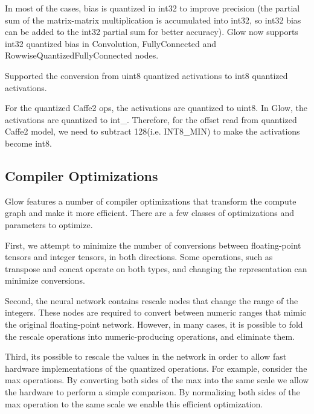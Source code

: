 In most of the cases, bias is quantized in int32 to improve precision (the partial sum of the matrix-\/matrix multiplication is accumulated into int32, so int32 bias can be added to the int32 partial sum for better accuracy). Glow now supports int32 quantized bias in {\ttfamily Convolution}, {\ttfamily Fully\+Connected} and {\ttfamily Rowwise\+Quantized\+Fully\+Connected} nodes.


\begin{DoxyItemize}
\item Supported the conversion from uint8 quantized activations to int8 quantized activations.
\end{DoxyItemize}

For the quantized Caffe2 ops, the activations are quantized to uint8. In Glow, the activations are quantized to int\+\_. Therefore, for the offset read from quantized Caffe2 model, we need to subtract 128(i.\+e. I\+N\+T8\+\_\+\+M\+IN) to make the activations become int8.

\subsection*{Compiler Optimizations}

Glow features a number of compiler optimizations that transform the compute graph and make it more efficient. There are a few classes of optimizations and parameters to optimize.

First, we attempt to minimize the number of conversions between floating-\/point tensors and integer tensors, in both directions. Some operations, such as \textquotesingle{}transpose\textquotesingle{} and \textquotesingle{}concat\textquotesingle{} operate on both types, and changing the representation can minimize conversions.

Second, the neural network contains \textquotesingle{}rescale\textquotesingle{} nodes that change the range of the integers. These nodes are required to convert between numeric ranges that mimic the original floating-\/point network. However, in many cases, it is possible to fold the rescale operations into numeric-\/producing operations, and eliminate them.

Third, it\textquotesingle{}s possible to rescale the values in the network in order to allow fast hardware implementations of the quantized operations. For example, consider the \textquotesingle{}max\textquotesingle{} operations. By converting both sides of the \textquotesingle{}max\textquotesingle{} into the same scale we allow the hardware to perform a simple comparison. By normalizing both sides of the \textquotesingle{}max\textquotesingle{} operation to the same scale we enable this efficient optimization.

